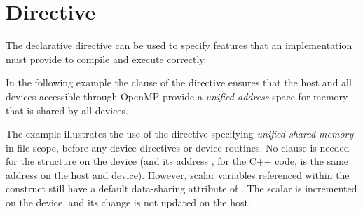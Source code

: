 \section{ Directive}
\label{sec:requires}

The declarative  directive can be used to 
specify features that an implementation must provide to compile and 
execute correctly.

In the following example the  clause 
of the  directive ensures that the host and all 
devices accessible through OpenMP provide a \emph{unified address} space
for memory that is shared by all devices.

The example illustrates the use of the  directive specifying
\emph{unified shared memory} in file scope, before any device 
directives or device routines. No  clause is needed for
the  structure on the device (and its address , for the C++ code,
is the same address on the host and device).
However, scalar variables referenced within the 
construct still have a default data-sharing attribute of .
The  scalar is incremented on the device, and its change is
not updated on the host.




